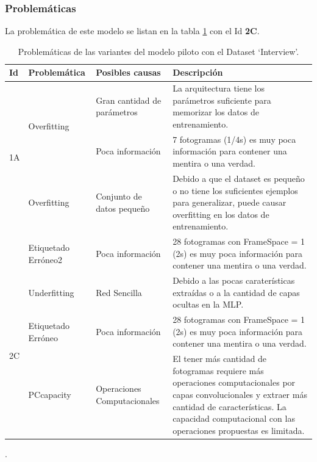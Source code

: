 \begin{onehalfspacing}
\subsubsection{Problemáticas}
\label{sec:ProblematicasVariantesModeloPilotoTrial}

La problemática de este modelo se listan en la tabla \ref{tab:ProblematicasPilotointerview} con el Id \textbf{2C}.


\begin{table}[h!]
\centering
    \begin{tabular}{|p{1cm}|p{3cm}|p{3cm}|p{7cm}|}
        \hline 
        Id & Problemática & Posibles causas & Descripción\tabularnewline
        \hline 
        \hline 
        \multirow{3}{*}{1A} & \multirow{2}{*}{Overfitting} & Gran cantidad de parámetros & La arquitectura tiene los parámetros suficiente para memorizar los
        datos de entrenamiento.\tabularnewline
        \cline{2-4} \cline{3-4} \cline{4-4} 
         & Etiquetado Erróneo & Poca información  & 7 fotogramas (1/4s) es muy poca información para contener una mentira
        o una verdad.\tabularnewline
        \hline 
        \multirow{2}{*}{1B} & Overfitting & Conjunto de datos pequeño & Debido a que el dataset es pequeño o no tiene los suficientes ejemplos
        para generalizar, puede causar overfitting en los datos de entrenamiento.\tabularnewline
        \cline{2-4} \cline{3-4} \cline{4-4} 
         & Etiquetado Erróneo2 & Poca información  & 28 fotogramas con FrameSpace = 1 (2s) es muy poca información para contener
        una mentira o una verdad.\tabularnewline
        \hline 
        \multirow{3}{*}{2C} & Underfitting & Red Sencilla & Debido a las pocas caraterísticas extraídas o a la cantidad de capas
        ocultas en la MLP.\tabularnewline
        \cline{2-4} \cline{3-4} \cline{4-4} 
         & Etiquetado Erróneo & Poca información  & 28 fotogramas con FrameSpace = 1 (2s) es muy poca información para contener
        una mentira o una verdad.\tabularnewline
        \cline{2-4} \cline{3-4} \cline{4-4} 
         & PCcapacity & Operaciones Computacionales & El tener más cantidad de fotogramas requiere más operaciones computacionales
        por capas convolucionales y extraer más cantidad de características. La capacidad computacional con las operaciones propuestas es limitada.\tabularnewline
        \hline 
    \end{tabular}
    \caption{\footnotesize Problemáticas de las variantes del modelo piloto con el Dataset `Interview'.}.
    \label{tab:ProblematicasPilotointerview}
\end{table}


\end{onehalfspacing}
